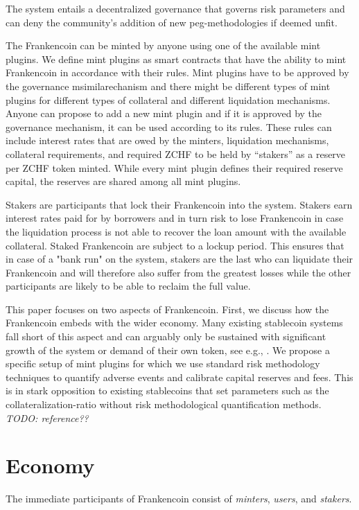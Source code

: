 \documentclass[english,11pt]{article}
\begin{document}
The system entails a decentralized governance that governs risk parameters and can deny the community's addition of new peg-methodologies if deemed unfit.

The Frankencoin can be minted by anyone using one of the available 
mint plugins. We define mint plugins as smart contracts that have the ability to mint Frankencoin in accordance with their rules. 
Mint plugins have to be approved by the governance msimilarechanism and there might be different types of mint plugins for different types of collateral and different liquidation mechanisms. Anyone can propose to add a new mint plugin and if it is approved by the governance mechanism, it can be used according to its rules. These rules can include interest rates that are owed by the minters, liquidation mechanisms, collateral requirements, and required ZCHF
to be held by ``stakers'' as a reserve per ZCHF token minted.
While every mint plugin defines their required reserve capital,
the reserves are shared among all mint plugins.

Stakers are participants that lock their Frankencoin into the system. 
Stakers
earn interest rates paid for by borrowers and in turn risk
to lose Frankencoin in case the liquidation process is not able to recover
the loan amount with the available collateral.
Staked Frankencoin are subject to a lockup period. This ensures that in case of a "bank run" on the system, stakers are the last who can liquidate their Frankencoin and will therefore also suffer from the greatest losses while the other participants are likely to be able to reclaim the full value.

This paper focuses on two aspects of Frankencoin. First, we discuss
how the Frankencoin embeds with the wider economy. Many
existing stablecoin systems fall short of this aspect and can
arguably only be sustained with significant growth of the system
or demand of their own token, see e.g., \cite{clements2021built}.
We propose a specific setup of mint plugins for which
we use standard risk methodology techniques
to quantify adverse events and calibrate
capital reserves and fees. This is in stark opposition
to existing stablecoins that set parameters such as the
collateralization-ratio without risk methodological quantification
methods. \emph{TODO: reference??}

\section{Economy}
The immediate participants of Frankencoin consist of 
\emph{minters}, \emph{users}, and \emph{stakers}.
\end{document}
